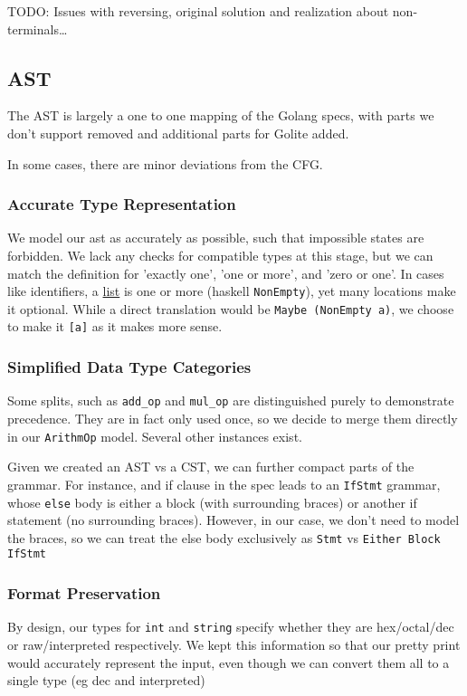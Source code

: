 \documentclass[11pt]{article}
\begin{document}
TODO: Issues with reversing, original solution and realization about
non-terminals\ldots{}
\subsection{AST}
\label{sec:orgbe36410}
The AST is largely a one to one mapping of the Golang specs, with
parts we don't support removed and additional parts for Golite added.

In some cases, there are minor deviations from the CFG.
\subsubsection{Accurate Type Representation}
\label{sec:orga87e247}
We model our ast as accurately as possible, such that impossible
states are forbidden. We lack any checks for compatible types at
this stage, but we can match the definition for 'exactly one', 'one
or more', and 'zero or one'. In cases like identifiers, a \href{https://golang.org/ref/spec\#IdentifierList}{list} is
one or more (haskell \texttt{NonEmpty}), yet many locations make it
optional. While a direct translation would be \texttt{Maybe (NonEmpty a)},
we choose to make it \texttt{[a]} as it makes more sense.
\subsubsection{Simplified Data Type Categories}
\label{sec:org36f926b}
Some splits, such as \texttt{add\_op} and \texttt{mul\_op} are distinguished
purely to demonstrate precedence. They are in fact only used once,
so we decide to merge them directly in our \texttt{ArithmOp}
model. Several other instances exist.

Given we created an AST vs a CST, we can further compact parts of
the grammar. For instance, and if clause in the spec leads to an
\texttt{IfStmt} grammar, whose \texttt{else} body is either a block (with
surrounding braces) or another if statement (no surrounding
braces). However, in our case, we don't need to model the braces,
so we can treat the else body exclusively as \texttt{Stmt} vs \texttt{Either
    Block IfStmt}
\subsubsection{Format Preservation}
\label{sec:orgc5abd08}
By design, our types for \texttt{int} and \texttt{string} specify whether they
are hex/octal/dec or raw/interpreted respectively. We kept this
information so that our pretty print would accurately represent
the input, even though we can convert them all to a single type
(eg dec and interpreted)
\end{document}
